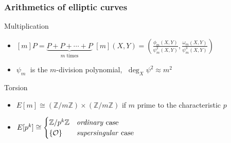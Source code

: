 \documentclass[10pt]{beamer}
\newcommand{\Z}{\mathbb{Z}}  %
\newcommand{\isom}{\cong}  %
\newcommand{\0}{\mathcal{O}}  %
\begin{document}
\begin{frame}
  \frametitle{Arithmetics of elliptic curves}

  \begin{block}{Multiplication}
    \begin{itemize}
    \item $[m]P = \underbrace{P + P + \cdots + P}_{m \text{ times}}$
      \hfill $[m](X,Y) = \left(\frac{\phi_m(X,Y)}{\psi_m^2(X,Y)},
      \frac{\omega_m(X,Y)}{\psi_m^3(X,Y)}\right)\quad$
    \item $\psi_m\;$ is the $m$-division polynomial, $\;\deg_X
      \psi^2\approx m^2$
    \end{itemize}
  \end{block}

  \begin{block}{Torsion}
    \begin{itemize}
    \item $E[m] \isom (\Z/m\Z)\times(\Z/m\Z)$ if $m$ prime to the
      characteristic $p$
    \item $E[p^k] \isom \begin{cases}
	\Z/p^k\Z &\text{\emph{ordinary} case}\\
	\{\0\} &\text{\emph{supersingular} case}
      \end{cases}$
    \end{itemize}
  \end{block}
\end{frame}

\end{document}
